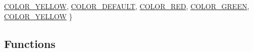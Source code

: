 \begin{DoxyCompactItemize}
\hyperlink{namespacetesting_1_1internal_ae78c352c52b710a680c35b87b1c5d965a220df2a47a11552fb8631253ef7c3f10}{\-C\-O\-L\-O\-R\-\_\-\-Y\-E\-L\-L\-O\-W}, 
\*
\hyperlink{namespacetesting_1_1internal_ae78c352c52b710a680c35b87b1c5d965aaeda96851415e6bb57229cf139545439}{\-C\-O\-L\-O\-R\-\_\-\-D\-E\-F\-A\-U\-L\-T}, 
\hyperlink{namespacetesting_1_1internal_ae78c352c52b710a680c35b87b1c5d965a55978b2a4d309f4f009fd1baa7808358}{\-C\-O\-L\-O\-R\-\_\-\-R\-E\-D}, 
\hyperlink{namespacetesting_1_1internal_ae78c352c52b710a680c35b87b1c5d965a125edbdad9257143fc1fabf1c686d959}{\-C\-O\-L\-O\-R\-\_\-\-G\-R\-E\-E\-N}, 
\hyperlink{namespacetesting_1_1internal_ae78c352c52b710a680c35b87b1c5d965a220df2a47a11552fb8631253ef7c3f10}{\-C\-O\-L\-O\-R\-\_\-\-Y\-E\-L\-L\-O\-W}
 \}
\end{DoxyCompactItemize}
\subsection*{\-Functions}
